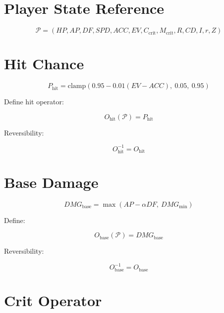 
\section*{Player State Reference}

\[
\mathcal{P}
= (HP, AP, DF, SPD, ACC, EV, C_{\text{crit}}, M_{\text{crit}}, R, CD, I, r, Z)
\]


\section*{Hit Chance}

\[
P_{\text{hit}}
= \mathrm{clamp}\left(0.95 - 0.01(EV - ACC),\ 0.05,\ 0.95\right)
\]

Define hit operator:

\[
O_{\text{hit}}(\mathcal{P})
= P_{\text{hit}}
\]

Reversibility:

\[
O_{\text{hit}}^{-1} = O_{\text{hit}}
\]


\section*{Base Damage}

\[
DMG_{\text{base}}
= \max(AP - \alpha DF,\ DMG_{\min})
\]

Define:

\[
O_{\text{base}}(\mathcal{P})
= DMG_{\text{base}}
\]

Reversibility:

\[
O_{\text{base}}^{-1} = O_{\text{base}}
\]


\section*{Crit Operator}

